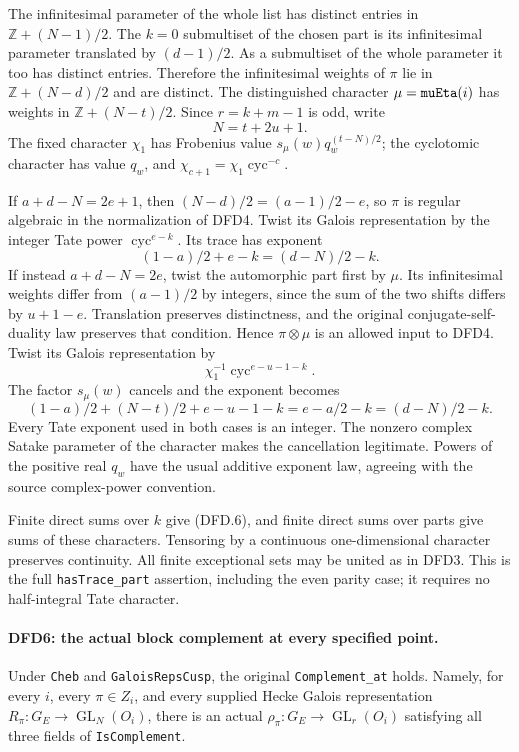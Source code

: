 The infinitesimal parameter of the whole list has distinct
entries in $\mathbb Z+(N-1)/2$. The $k=0$ submultiset of the
chosen part is its infinitesimal parameter translated by
$(d-1)/2$. As a submultiset of the whole parameter it too has
distinct entries. Therefore the infinitesimal weights of
$\pi$ lie in $\mathbb Z+(N-d)/2$ and are distinct. The
distinguished character $\mu=\texttt{mu\allowbreak Eta}(i)$ has weights in
$\mathbb Z+(N-t)/2$. Since $r=k+m-1$ is odd, write
\[
                    N=t+2u+1.                           \tag{DFD.7}
\]
The fixed character $\chi_1$ has Frobenius value
$s_\mu(w)q_w^{(t-N)/2}$; the cyclotomic character has value
$q_w$, and $\chi_{c+1}=\chi_1\operatorname{cyc}^{-c}$.

If $a+d-N=2e+1$, then
$(N-d)/2=(a-1)/2-e$, so $\pi$ is regular algebraic in the
normalization of DFD4. Twist its Galois representation by the
integer Tate power $\operatorname{cyc}^{e-k}$. Its trace has
exponent
\[
                 (1-a)/2+e-k=(d-N)/2-k.
\]
If instead $a+d-N=2e$, twist the automorphic part first by
$\mu$. Its infinitesimal weights differ from $(a-1)/2$ by
integers, since the sum of the two shifts differs by
$u+1-e$. Translation preserves distinctness, and the original
conjugate-self-duality law preserves that condition. Hence
$\pi\otimes\mu$ is an allowed input to DFD4. Twist its
Galois representation by
\[
                \chi_1^{-1}\operatorname{cyc}^{e-u-1-k}.
\]
The factor $s_\mu(w)$ cancels and the exponent becomes
\[
 (1-a)/2+(N-t)/2+e-u-1-k
          =e-a/2-k=(d-N)/2-k.                            \tag{DFD.8}
\]
Every Tate exponent used in both cases is an integer.
The nonzero complex Satake parameter of the character makes
the cancellation legitimate. Powers of the positive real
$q_w$ have the usual additive exponent law, agreeing with the
source complex-power convention.

Finite direct sums over $k$ give (DFD.6), and finite direct
sums over parts give sums of these characters. Tensoring by a
continuous one-dimensional character preserves continuity.
All finite exceptional sets may be united as in DFD3. This is
the full \texttt{has\allowbreak Trace\_\allowbreak part} assertion, including the even
parity case; it requires no half-integral Tate character.

\paragraph{DFD6: the actual block complement at every specified point.}
\label{claim:DFD6}
Under \texttt{Cheb} and \texttt{Galois\allowbreak Reps\allowbreak Cusp}, the original
\texttt{Complement\_\allowbreak at} holds. Namely, for every $i$, every
$\pi\in Z_i$, and every supplied Hecke Galois representation
$R_\pi:G_E\to\operatorname{GL}_N(O_i)$, there is an actual
$\rho_\pi:G_E\to\operatorname{GL}_r(O_i)$ satisfying all
three fields of \texttt{Is\allowbreak Complement}.

